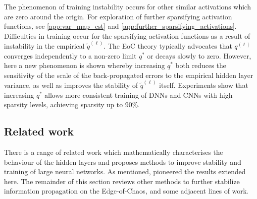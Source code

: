\documentclass{article}
\theoremstyle{plain}
\theoremstyle{definition}
\theoremstyle{remark}
\begin{document}

 The phenomenon of training instability occurs for other similar activations which are zero around the origin. For exploration of further sparsifying activation functions, see \cref{app:var_map_cst} and \cref{app:further_sparsifying_activations}. Difficulties in training occur for the sparsifying activation functions as a result of instability in the empirical $\tilde{q}^{(\ell)}$. The EoC theory typically advocates that $q^{(\ell)}$ converges independently to a non-zero limit $q^*$ or decays slowly to zero. However, here a new phenomenon is shown whereby increasing $q^*$ both reduces the sensitivity of the scale of the back-propagated errors to the empirical hidden layer variance, as well as improves the stability of $\tilde{q}^{(\ell)}$ itself. Experiments show that increasing $q^*$ allows more consistent training of DNNs and CNNs with high sparsity levels, achieving sparsity up to 90\%.



\subsection{Related work}\label{sec:related_work}
  
There is a range of related work which mathematically characterises the behaviour of the hidden layers and proposes methods to improve stability and training of large neural networks. As mentioned, \cite{price_deep_2023} pioneered the results extended here. The remainder of this section reviews other methods to further stabilize information propagation on the Edge-of-Chaos, and some adjacent lines of work.
\end{document}
